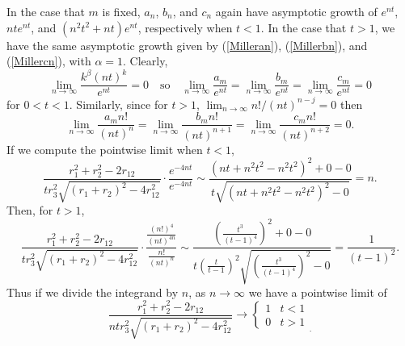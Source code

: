 \documentclass[12pt]{amsart}
\theoremstyle{remark}
\begin{document}
In the case that $m$ is fixed, $a_n$, $b_n$, and $c_n$ again have asymptotic growth of $e^{nt}$, $nte^{nt}$, and $(n^2t^2+nt)e^{nt}$, respectively when $t<1$.  In the case that $t>1$, we have the same asymptotic growth given by (\ref{Milleran}), (\ref{Millerbn}), and (\ref{Millercn}), with $\alpha=1$.  Clearly,
\[\lim_{n\rightarrow\infty}\frac{k^{\beta}(nt)^k}{e^{nt}}=0\quad\text{so}\quad\lim_{n\rightarrow\infty}\frac{a_m}{e^{nt}}=\lim_{n\rightarrow\infty}\frac{b_m}{e^{nt}}=\lim_{n\rightarrow\infty}\frac{c_m}{e^{nt}}=0\]
for $0<t<1$.
Similarly, since for $t>1$,
$\displaystyle\lim_{n\rightarrow\infty}n!/(nt)^{n-j}=0$
then
\[\lim_{n\rightarrow\infty}\frac{a_mn!}{(nt)^n}=\lim_{n\rightarrow\infty}\frac{b_mn!}{(nt)^{n+1}}=\lim_{n\rightarrow\infty}\frac{c_mn!}{(nt)^{n+2}}=0.\]
If we compute the pointwise limit when $t<1$,
\[\frac{r_1^2+r_2^2-2r_{12}}{tr_3^2\sqrt{(r_1+r_2)^2-4r_{12}^2}}\cdot\frac{e^{-4nt}}{e^{-4nt}}\sim\frac{(nt+n^2t^2-n^2t^2)^2+0-0}{t\sqrt{(nt+n^2t^2-n^2t^2)^2-0}}=n.\]
Then, for $t>1$,
\[\frac{r_1^2+r_2^2-2r_{12}}{tr_3^2\sqrt{(r_1+r_2)^2-4r_{12}^2}}\cdot\frac{\frac{(n!)^4}{(nt)^{4n}}}{\frac{n!}{(nt)^n}}\sim\frac{(\frac{t^3}{(t-1)^4})^2+0-0}{t\left(\frac{t}{t-1}\right)^2\sqrt{(\frac{t^3}{(t-1)^4})^2-0}}=\frac{1}{(t-1)^2}.\]
Thus if we divide the integrand by $n$, as $n\rightarrow\infty$ we have a pointwise limit of
\begin{equation}
	\label{lim:fixed}
	\frac{r_1^2+r_2^2-2r_{12}}{ntr_3^2\sqrt{(r_1+r_2)^2-4r_{12}^2}}
	\rightarrow\left\{
	\begin{array}{ll}
		1&t<1\\0&t>1
	\end{array}\right._.
\end{equation}
\end{document}
